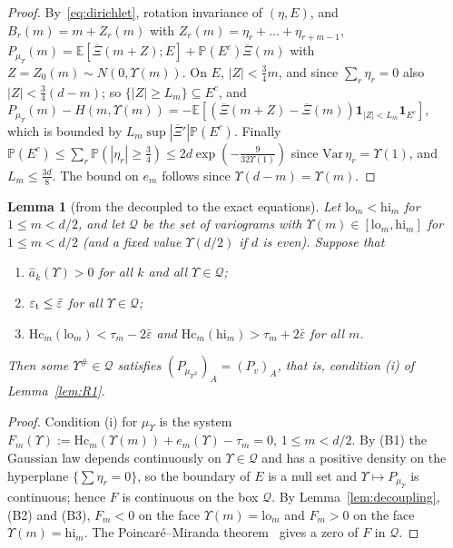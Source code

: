 \documentclass[11pt]{amsart}
\newtheorem{lemma}[theorem]{Lemma}
\theoremstyle{definition}
\theoremstyle{remark}
\numberwithin{equation}{section}
\newcommand{\E}{\mathbb{E}}
\renewcommand{\Pr}{\mathbb{P}}
\newcommand{\one}{\mathbf{1}}
\newcommand{\Xb}{\overline{\Xi}}
\begin{document}
\begin{proof}
By~\eqref{eq:dirichlet}, rotation invariance of $(\eta,E)$, and $B_r(m)=m+Z_r(m)$ with $Z_r(m)=\eta_r+\dots+\eta_{r+m-1}$,
$P_{\mu_\Upsilon}(m)=\E[\Xb(m+Z);E]+\Pr(E^c)\Xb(m)$ with $Z=Z_0(m)\sim N(0,\Upsilon(m))$. On $E$, $|Z|<\frac34m$, and since
$\sum_r\eta_r=0$ also $|Z|<\frac34(d-m)$; so $\{|Z|\ge L_m\}\subseteq E^c$, and
$P_{\mu_\Upsilon}(m)-H(m,\Upsilon(m))=-\E[(\Xb(m+Z)-\Xb(m))\one_{|Z|<L_m}\one_{E^c}]$, which is bounded by $L_m\sup|\Xb'|\Pr(E^c)$.
Finally $\Pr(E^c)\le\sum_r\Pr(|\eta_r|\ge\frac34)\le2d\exp(-\frac9{32\Upsilon(1)})$ since $\mathrm{Var}\,\eta_r=\Upsilon(1)$, and
$L_m\le\frac{3d}8$. The bound on $e_m$ follows since $\Upsilon(d-m)=\Upsilon(m)$.
\end{proof}

\begin{lemma}[from the decoupled to the exact equations]\label{lem:B}
Let $\mathrm{lo}_m<\mathrm{hi}_m$ for $1\le m<d/2$, and let $\mathcal Q$ be the set of variograms with
$\Upsilon(m)\in[\mathrm{lo}_m,\mathrm{hi}_m]$ for $1\le m<d/2$ (and a fixed value $\Upsilon(d/2)$ if $d$ is even). Suppose that
\begin{enumerate}
\item[(B1)] $\hat a_k(\Upsilon)>0$ for all $k$ and all $\Upsilon\in\mathcal Q$;
\item[(B2)] $\varepsilon_{\rm t}\le\bar\varepsilon$ for all $\Upsilon\in\mathcal Q$;
\item[(B3)] $\mathrm{Hc}_m(\mathrm{lo}_m)<\tau_m-2\bar\varepsilon$ and $\mathrm{Hc}_m(\mathrm{hi}_m)>\tau_m+2\bar\varepsilon$ for all $m$.
\end{enumerate}
Then some $\Upsilon^\#\in\mathcal Q$ satisfies $(P_{\mu_{\Upsilon^\#}})_A=(P_v)_A$, that is, condition (i) of Lemma~\ref{lem:R1}.
\end{lemma}

\begin{proof}
Condition (i) for $\mu_\Upsilon$ is the system $F_m(\Upsilon):=\mathrm{Hc}_m(\Upsilon(m))+e_m(\Upsilon)-\tau_m=0$, $1\le m<d/2$. By (B1)
the Gaussian law depends continuously on $\Upsilon\in\mathcal Q$ and has a positive density on the hyperplane
$\{\sum\eta_r=0\}$, so the boundary of $E$ is a null set and $\Upsilon\mapsto P_{\mu_\Upsilon}$ is continuous; hence $F$ is continuous on
the box $\mathcal Q$. By Lemma~\ref{lem:decoupling}, (B2) and (B3), $F_m<0$ on the face $\Upsilon(m)=\mathrm{lo}_m$ and $F_m>0$ on the
face $\Upsilon(m)=\mathrm{hi}_m$. The Poincar\'e--Miranda theorem~\cite{Kulpa} gives a zero of $F$ in $\mathcal Q$.
\end{proof}
\end{document}
